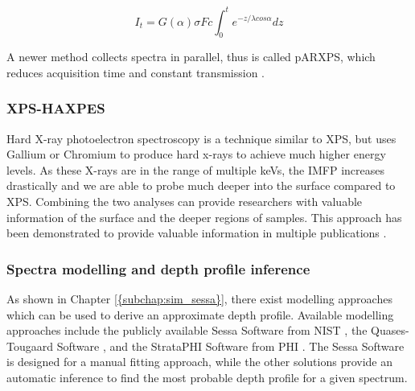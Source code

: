 \begin{equation}
\label{intensity_angle}
    I_{t} = G(\alpha)\sigma F c \int_{0}^{t} e^{-z/ \lambda cos \alpha} dz
\end{equation}

A newer method collects spectra in parallel, thus is called pARXPS, which reduces acquisition time and constant transmission \cite{bure_assessing_2023, sodhi_surface_2017}.

\subsubsection{XPS-HAXPES}
Hard X-ray photoelectron spectroscopy is a technique similar to XPS, but uses Gallium or Chromium to produce hard x-rays to achieve much higher energy levels. As these X-rays are in the range of multiple keVs, the IMFP increases drastically and we are able to probe much deeper into the surface compared to XPS. Combining the two analyses can provide researchers with valuable information of the surface and the deeper regions of samples. This approach has been demonstrated to provide valuable information in multiple publications \cite{bure_assessing_2023, siol_concepts_2020}. 

\subsubsection{Spectra modelling and depth profile inference}
As shown in Chapter \ref{{subchap:sim_sessa}}, there exist modelling approaches which can be used to derive an approximate depth profile. Available modelling approaches include the publicly available Sessa Software from NIST \cite{smekal_simulation_2005}, the Quases-Tougaard Software \cite{zborowski_comparison_2022}, and the StrataPHI Software from PHI \cite{noauthor_updated_nodate}. The Sessa Software is designed for a manual fitting approach, while the other solutions provide an automatic inference to find the most probable depth profile for a given spectrum.